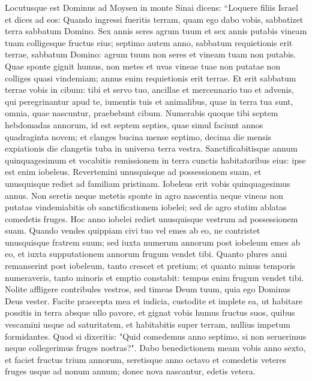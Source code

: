 \begin{biblechapter}  
\verse Locutusque est Dominus ad Moysen in monte Sinai dicens: 
\verse “Loquere filiis Israel et dices ad eos: Quando ingressi fueritis terram, quam ego dabo vobis, sabbatizet terra sabbatum Domino. 
\verse Sex annis seres agrum tuum et sex annis putabis vineam tuam colligesque fructus eius; 
\verse septimo autem anno, sabbatum requietionis erit terrae, sabbatum Domino: agrum tuum non seres et vineam tuam non putabis. 
\verse Quae sponte gignit humus, non metes et uvas vineae tuae non putatae non colliges quasi vindemiam; annus enim requietionis erit terrae. 
\verse Et erit sabbatum terrae vobis in cibum: tibi et servo tuo, ancillae et mercennario tuo et advenis, qui peregrinantur apud te, 
\verse iumentis tuis et animalibus, quae in terra tua sunt, omnia, quae nascuntur, praebebunt cibum. 
\verse Numerabis quoque tibi septem hebdomadas annorum, id est septem septies, quae simul faciunt annos quadraginta novem; 
\verse et clanges bucina mense septimo, decima die mensis expiationis die clangetis tuba in universa terra vestra.  
\verse Sanctificabitisque annum quinquagesimum et vocabitis remissionem in terra cunctis habitatoribus eius: ipse est enim iobeleus. Revertemini unusquisque ad possessionem suam, et unusquisque rediet ad familiam pristinam. 
\verse Iobeleus erit vobis quinquagesimus annus. Non seretis neque metetis sponte in agro nascentia neque vineas non putatas vindemiabitis 
\verse ob sanctificationem iobelei; sed de agro statim ablatas comedetis fruges. 
\verse Hoc anno iobelei rediet unusquisque vestrum ad possessionem suam. 
\verse Quando vendes quippiam civi tuo vel emes ab eo, ne contristet unusquisque fratrem suum; sed iuxta numerum annorum post iobeleum emes ab eo, 
\verse et iuxta supputationem annorum frugum vendet tibi. 
\verse Quanto plures anni remanserint post iobeleum, tanto crescet et pretium; et quanto minus temporis numeraveris, tanto minoris et emptio constabit: tempus enim frugum vendet tibi.  
\verse Nolite affligere contribules vestros, sed timeas Deum tuum, quia ego Dominus Deus vester. 
\verse Facite praecepta mea et iudicia, custodite et implete ea, ut habitare possitis in terra absque ullo pavore, 
\verse et gignat vobis humus fructus suos, quibus vescamini usque ad saturitatem, et habitabitis super terram, nullius impetum formidantes. 
\verse Quod si dixeritis: "Quid comedemus anno septimo, si non seruerimus neque collegerimus fruges nostras?". 
\verse Dabo benedictionem meam vobis anno sexto, et faciet fructus trium annorum, 
\verse seretisque anno octavo et comedetis veteres fruges usque ad nonum annum; donec nova nascantur, edetis vetera. 

\end{biblechapter}
